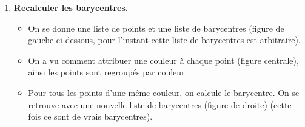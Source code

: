 \documentclass[11pt,class=report,crop=false]{standalone}
\begin{document}
\begin{activite}[Barycentres]
\begin{enumerate}
\begin{enumerate}
	\end{enumerate}

	\item \textbf{Recalculer les barycentres.}
	
	\begin{itemize}
	    \item On se donne une liste de points et une liste de barycentres (figure de gauche ci-dessous, pour l'instant cette liste de \og{}barycentres\fg{} est arbitraire).
     	\item On a vu comment attribuer une couleur à chaque point (figure centrale), ainsi les points sont regroupés par couleur. 
     	\item Pour tous les points d'une même couleur, on calcule le barycentre. On se retrouve avec une nouvelle liste de barycentres (figure de droite) (cette fois ce sont de \og{}vrais\fg{} barycentres).
     \end{itemize}
 

\end{enumerate}
\end{activite}
\end{document}
